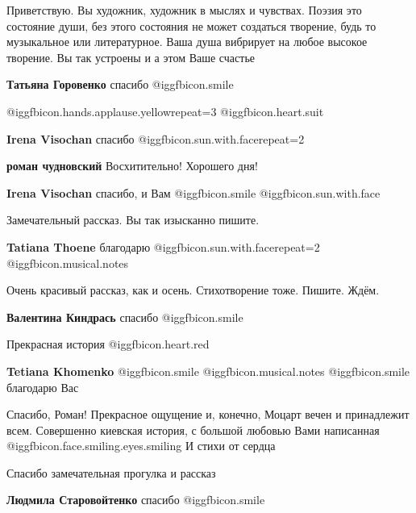 \begin{itemize}

Приветствую. Вы художник, художник в мыслях и чувствах. Поэзия это состояние
души, без этого состояния не может создаться творение, будь то музыкальное или
литературное. Ваша душа вибрирует на любое высокое творение. Вы так устроены и
а этом Ваше счастье

\textbf{Татьяна Горовенко} спасибо @igg{fbicon.smile} 

 @igg{fbicon.hands.applause.yellow}{repeat=3} @igg{fbicon.heart.suit}

\begin{itemize} %
\textbf{Irena Visochan} спасибо @igg{fbicon.sun.with.face}{repeat=2} 

\textbf{роман чудновский} Восхитительно! Хорошего дня!

\textbf{Irena Visochan} спасибо, и Вам @igg{fbicon.smile}  @igg{fbicon.sun.with.face} 
\end{itemize} %

Замечательный рассказ. Вы так изысканно пишите.

\textbf{Tatiana Thoene} благодарю @igg{fbicon.sun.with.face}{repeat=2}  @igg{fbicon.musical.notes} 

Очень красивый рассказ, как и осень. Стихотворение тоже. Пишите. Ждём.

\textbf{Валентина Киндрась} спасибо @igg{fbicon.smile} 

Прекрасная история @igg{fbicon.heart.red}

\textbf{Tetiana Khomenko}  @igg{fbicon.smile}  @igg{fbicon.musical.notes}  @igg{fbicon.smile} благодарю Вас


Спасибо, Роман! Прекрасное ощущение и, конечно, Моцарт вечен и принадлежит
всем. Совершенно киевская история, с большой любовью Вами написанная  @igg{fbicon.face.smiling.eyes.smiling}  И стихи
от сердца

Спасибо замечательная прогулка и рассказ

\textbf{Людмила Старовойтенко} спасибо @igg{fbicon.smile} 

\end{itemize} %
